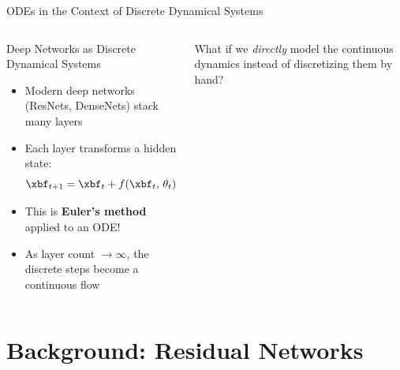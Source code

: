 \documentclass[aspectratio=169,xcolor=dvipsnames,svgnames,x11names,fleqn]{beamer}
\begin{document}
 
\begin{frame}{ODEs in the Context of Discrete Dynamical Systems}

\scriptsize

\begin{columns}
\begin{tblockFrost}{Deep Networks as Discrete Dynamical Systems}
\begin{itemize}
  \item Modern deep networks (ResNets, DenseNets) stack many layers
  \item Each layer transforms a hidden state:
$$
    \xbf_{t+1} = \xbf_t + f(\xbf_t,\,\theta_t)
$$
  \item This is \textbf{Euler's method} applied to an ODE!
  \item As layer count $\to \infty$, the discrete steps become a continuous flow
\end{itemize}
\end{tblockFrost}
\begin{alertblock}{}
What if we \emph{directly} model the continuous dynamics instead of discretizing them by hand?
\end{alertblock}



\end{columns}

\end{frame}

\section{Background: Residual Networks}
 
\end{document}
